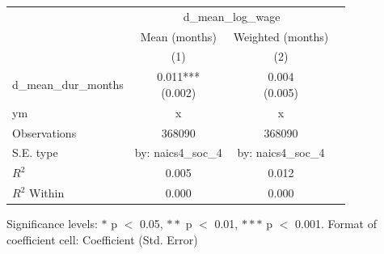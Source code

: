 \renewcommand\cellalign{t}
\begin{threeparttable}
\begin{tabular}{lccc}
\toprule
 & \multicolumn{2}{c}{d_mean_log_wage} \\
\cmidrule(lr){2-3} 
 & Mean (months) & Weighted (months) \\
 & (1) & (2) \\
\midrule
\addlinespace
d_mean_dur_months & \makecell{0.011*** \\ (0.002)} & \makecell{0.004 \\ (0.005)} \\
\midrule
\addlinespace
ym & x & x \\
\midrule
\addlinespace
Observations & 368090 & 368090 \\
S.E. type & by: naics4_soc_4 & by: naics4_soc_4 \\
$R^2$ & 0.005 & 0.012 \\
$R^2$ Within & 0.000 & 0.000 \\
\bottomrule
\end{tabular}
\footnotesize Significance levels: $*$ p $<$ 0.05, $**$ p $<$ 0.01, $***$ p $<$ 0.001. Format of coefficient cell: Coefficient 
 (Std. Error)
\end{threeparttable}